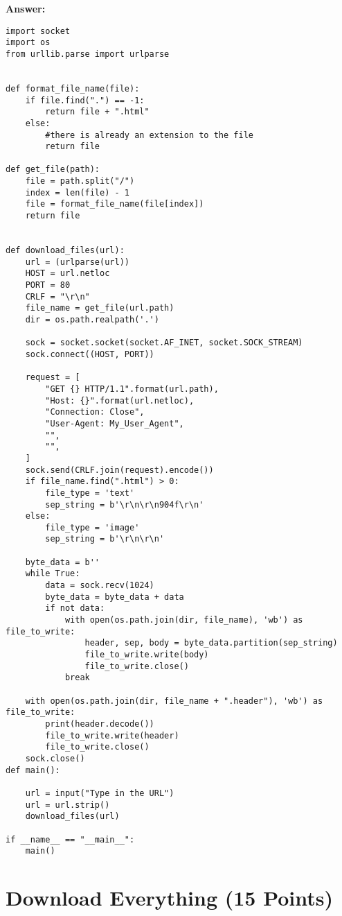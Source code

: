 \documentclass{WeSTassignment}
\begin{document}
 \textbf{Answer: } \\
\begin{lstlisting}
import socket
import os
from urllib.parse import urlparse


def format_file_name(file):
    if file.find(".") == -1:
        return file + ".html"
    else:
        #there is already an extension to the file
        return file

def get_file(path):
    file = path.split("/")
    index = len(file) - 1
    file = format_file_name(file[index])
    return file


def download_files(url):
    url = (urlparse(url))
    HOST = url.netloc
    PORT = 80
    CRLF = "\r\n"
    file_name = get_file(url.path)
    dir = os.path.realpath('.')

    sock = socket.socket(socket.AF_INET, socket.SOCK_STREAM)
    sock.connect((HOST, PORT))

    request = [
        "GET {} HTTP/1.1".format(url.path),
        "Host: {}".format(url.netloc),
        "Connection: Close",
        "User-Agent: My_User_Agent",
        "",
        "",
    ]
    sock.send(CRLF.join(request).encode())
    if file_name.find(".html") > 0:
        file_type = 'text'
        sep_string = b'\r\n\r\n904f\r\n'
    else:
        file_type = 'image'
        sep_string = b'\r\n\r\n'

    byte_data = b''
    while True:
        data = sock.recv(1024)
        byte_data = byte_data + data
        if not data:
            with open(os.path.join(dir, file_name), 'wb') as file_to_write:
                header, sep, body = byte_data.partition(sep_string)
                file_to_write.write(body)
                file_to_write.close()
            break

    with open(os.path.join(dir, file_name + ".header"), 'wb') as file_to_write:
        print(header.decode())
        file_to_write.write(header)
        file_to_write.close()
    sock.close()
def main():

    url = input("Type in the URL")
    url = url.strip()
    download_files(url)

if __name__ == "__main__":
    main()

\end{lstlisting}


\section{Download Everything (15 Points)}
\end{document}
